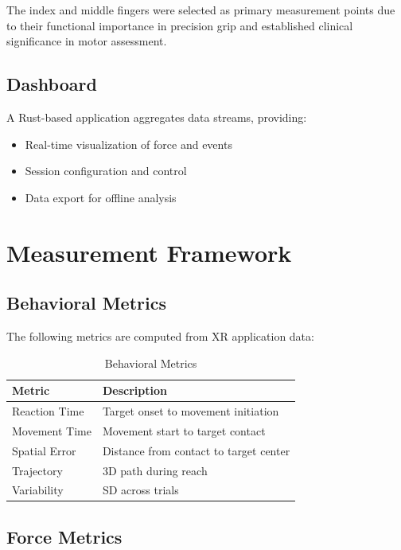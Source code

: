\documentclass[11pt,twocolumn]{article}
\begin{document}
The index and middle fingers were selected as primary measurement points due to their functional importance in precision grip and established clinical significance in motor assessment.

\subsection{Dashboard}

A Rust-based application aggregates data streams, providing:

\begin{itemize}
    \item Real-time visualization of force and events
    \item Session configuration and control
    \item Data export for offline analysis
\end{itemize}

\section{Measurement Framework}

\subsection{Behavioral Metrics}

The following metrics are computed from XR application data:

\begin{table}[H]
\centering
\caption{Behavioral Metrics}
\begin{tabular}{lp{4cm}}
\toprule
\textbf{Metric} & \textbf{Description} \\
\midrule
Reaction Time & Target onset to movement initiation \\
Movement Time & Movement start to target contact \\
Spatial Error & Distance from contact to target center \\
Trajectory & 3D path during reach \\
Variability & SD across trials \\
\bottomrule
\end{tabular}
\label{tab:behavioral}
\end{table}

\subsection{Force Metrics}
\end{document}
